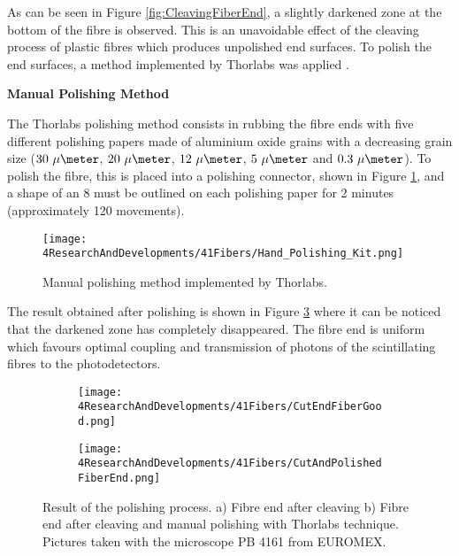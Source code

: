 As can be seen in Figure \ref{fig:CleavingFiberEnd}, a slightly darkened zone at the bottom of the fibre is observed. This is an unavoidable effect of the cleaving process of plastic fibres which produces unpolished end surfaces. To polish the end surfaces, a method implemented by Thorlabs was applied \cite{DiamondThorlabs}. 

\newpage
\textbf{Manual Polishing Method}

The Thorlabs polishing method consists in rubbing the fibre ends with five different polishing papers made of aluminium oxide grains with a decreasing grain size ($30~\mu\meter$, $20~\mu\meter$, $12~\mu\meter$, $5~\mu\meter$ and $0.3~\mu\meter$). To polish the fibre, this is placed into a polishing connector, shown in Figure \ref{fig:HandPolishingMethod}, and a shape of an 8 must be outlined on each polishing paper for 2 minutes (approximately 120 movements). 

\begin{figure}[h]
\centering
\texttt{[image: 4ResearchAndDevelopments/41Fibers/Hand\_Polishing\_Kit.png]}
\caption{Manual polishing method implemented by Thorlabs.\label{fig:HandPolishingMethod}}
\end{figure}
The result obtained after polishing is shown in Figure \ref{subfig:PolishFiberEnd} where it can be noticed that the darkened zone has completely disappeared. The fibre end is uniform which favours optimal coupling and transmission of photons of the scintillating fibres to the photodetectors.

\begin{figure}
\centering
    \begin{subfigure}[b]{0.5\textwidth}
    \centering
    \texttt{[image: 4ResearchAndDevelopments/41Fibers/CutEndFiberGood.png]}  
    \caption{\label{subfig:CleaveFiberEnd}}
    \end{subfigure}
    \hfill
    \begin{subfigure}[b]{0.45\textwidth}
    \centering
    \texttt{[image: 4ResearchAndDevelopments/41Fibers/CutAndPolishedFiberEnd.png]}  
    \caption{\label{subfig:PolishFiberEnd}}
    \end{subfigure}
 \caption{Result of the polishing process. a) Fibre end after cleaving b) Fibre end after cleaving and manual polishing with Thorlabs technique. Pictures taken with the microscope PB 4161 from EUROMEX.}
 \label{fig:ResultofPolishingProcess}
\end{figure}

